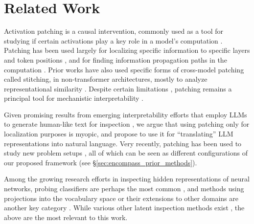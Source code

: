 \documentclass{article}
\theoremstyle{plain}
\theoremstyle{definition}
\theoremstyle{remark}
\begin{document}
\section{Related Work}
\label{sec:related_work}
Activation patching is a causal intervention, commonly used as a tool for studying if certain activations play a key role in a model's computation \cite{geiger2021causal, vig2020investigating}. 
Patching has been used largely for localizing specific information to specific layers and token positions \citep{goldowsky2023localizing, meng2022locating, meng2022mass, stolfo-etal-2023-mechanistic, merullo2023mechanism}, and for finding information propagation paths in the computation \cite{wang2022interpretability, geva-etal-2023-dissecting, hendel2023context, hanna2023how, lieberum2023does}. Prior works have also used specific forms of cross-model patching called stitching, in non-transformer architectures, mostly to analyze representational similarity \citep[e.g.,][]{bansal2021revisiting, csiszarik2021similarity, lenc2015understanding}. Despite certain limitations \cite{hase2023does, zhang2023towards}, patching remains a principal tool for mechanistic interpretability \cite{conmy2023automated}.

Given promising results from emerging interpretability efforts that employ LLMs to generate human-like text for inspection \citep[e.g.,][]{mousi2023llms, slobodkin-etal-2023-curious,bills2023language}, we argue that using patching only for localization purposes is myopic, and propose to use it for ``translating'' LLM representations into natural language. Very recently, patching has been used to study new problem setups \citep[e.g.,][]{pal2023future, hernandez2023linearity}, all of which can be seen as different configurations of our proposed framework (see \S\ref{sec:encompass_prior_methods}).

Among the growing research efforts in inspecting hidden representations of neural networks, probing classifiers are perhaps the most common \citep[e.g.,][]{alain2017understanding,belinkov2019analysis,belinkov2022probing, wang2023gaussian}, and methods using projections into the vocabulary space or their extensions to other domains are another key category \citep[e.g.,][]{merullo2023mechanism, geva-etal-2022-transformer,logitlens, belrose2023eliciting, dar2023analyzing, din2023jump, langedijk2023decoderlens, vilas2023analyzing}. While various other latent inspection methods exist \citep[e.g.,][]{zhou2018interpreting, strobelt2017lstmvis, ghandeharioun2021dissect, kim2018interpretability}, the above are the most relevant to this work.
\end{document}
